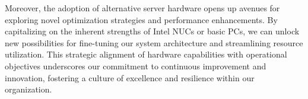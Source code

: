 Moreover, the adoption of alternative server hardware opens up avenues for
exploring novel optimization strategies and performance enhancements. By
capitalizing on the inherent strengths of Intel NUCs or basic PCs, we can unlock
new possibilities for fine-tuning our system architecture and streamlining
resource utilization. This strategic alignment of hardware capabilities with
operational objectives underscores our commitment to continuous improvement and
innovation, fostering a culture of excellence and resilience within our
organization.